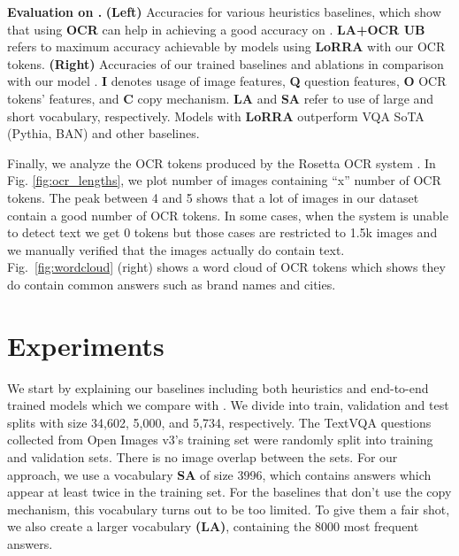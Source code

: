 \documentclass[10pt,twocolumn,letterpaper]{article}
\begin{document}
\begin{table}[t]
    \caption{\textbf{Evaluation on \datasetName.} \textbf{(Left)} Accuracies for various heuristics baselines, which show that using \textbf{OCR} can help in achieving a good accuracy on \datasetName. \textbf{LA+OCR UB} refers to maximum accuracy achievable by models using \textbf{LoRRA} with our OCR tokens. 
    \textbf{(Right)} Accuracies of our trained baselines and ablations in comparison with our model \textbf{\approachNameShort}. \textbf{I} denotes usage of image features, \textbf{Q} question features,  \textbf{O}  OCR tokens' features, and \textbf{C} copy mechanism. \textbf{LA} and \textbf{SA} refer to use of large and short vocabulary, respectively. Models with \textbf{LoRRA} outperform VQA SoTA (Pythia, BAN) and other baselines.}
    \label{tab:results}
    \vspace{-18pt}
\end{table}


 
Finally, we analyze the OCR tokens produced by the Rosetta OCR system \cite{borisyuk2018rosetta}. In Fig. \ref{fig:ocr_lengths}, we plot number of images containing ``x'' number of OCR tokens. The peak between 4 and 5 shows that a lot of images in our dataset contain a good number of OCR tokens. In some cases, when the system is unable to detect text we get 0 tokens but those cases are restricted to 1.5k images and we manually verified that the images actually do contain text. 
Fig.~\ref{fig:wordcloud} (right) shows a word cloud of OCR tokens which shows they do contain common answers such as brand names and cities. 
 \section{Experiments}
We start by explaining our baselines including both heuristics and end-to-end trained models which we compare with \approachNameShort.
We divide \datasetName into train, validation and test splits with size 34,602, 5,000,
and 5,734, respectively. 
The TextVQA questions collected from Open Images v3's training set were randomly split into training and validation sets. 
There is no image overlap between the sets.
For our approach, we use a vocabulary \textbf{SA} of size 3996, which contains answers which appear at least twice in the training set. For the baselines that don't use the copy mechanism, this vocabulary turns out to be too limited. To give them a fair shot, we also create a larger vocabulary \textbf{(LA)}, containing the 8000 most frequent answers.
\\
\end{document}
